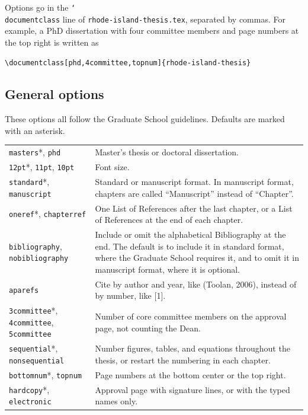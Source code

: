 \documentclass[11pt]{article}
\newcommand\cs[1]{\texttt{\char`\\#1}}
\newcommand\opt[1]{\texttt{#1}}
\newcommand\file[1]{\texttt{#1}}
\begin{document}
Options go in the \cs{documentclass} line of \file{rhode-island-thesis.tex}, separated by
commas.
For example, a PhD dissertation with four committee members and page numbers
at the top right is written as
\begin{verbatim}
\documentclass[phd,4committee,topnum]{rhode-island-thesis}
\end{verbatim}

\subsection{General options}

These options all follow the Graduate School guidelines.
Defaults are marked with an asterisk.

\medskip
\noindent
\begin{tabularx}{\linewidth}{@{}lX@{}}
\toprule
\opt{masters}*, \opt{phd} & Master's thesis or doctoral dissertation. \\
\opt{12pt}*, \opt{11pt}, \opt{10pt} & Font size. \\
\opt{standard}*, \opt{manuscript} & Standard or manuscript format. In
  manuscript format, chapters are called ``Manuscript'' instead of
  ``Chapter''. \\
\opt{oneref}*, \opt{chapterref} & One List of References after the last
  chapter, or a List of References at the end of each chapter. \\
\opt{bibliography}, \opt{nobibliography} & Include or omit the alphabetical
  Bibliography at the end. The default is to include it in standard format,
  where the Graduate School requires it, and to omit it in manuscript format,
  where it is optional. \\
\opt{aparefs} & Cite by author and year, like (Toolan, 2006), instead of by
  number, like [1]. \\
\opt{3committee}*, \opt{4committee}, \opt{5committee} & Number of core
  committee members on the approval page, not counting the Dean. \\
\opt{sequential}*, \opt{nonsequential} & Number figures, tables, and
  equations throughout the thesis, or restart the numbering in each
  chapter. \\
\opt{bottomnum}*, \opt{topnum} & Page numbers at the bottom center or the top
  right. \\
\opt{hardcopy}*, \opt{electronic} & Approval page with signature lines, or
  with the typed names only. \\
\bottomrule
\end{tabularx}
\end{document}
